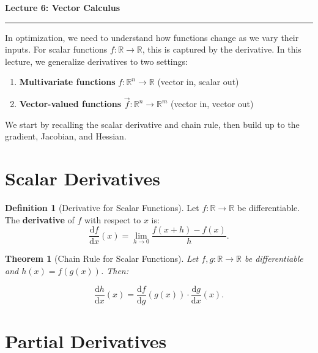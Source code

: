 \documentclass[10pt, twocolumn]{article}
\theoremstyle{definition}
\newtheorem{definition}{Definition}
\theoremstyle{plain}
\newtheorem{theorem}{Theorem}
\newcommand{\RR}{\mathbb{R}}
\begin{document}
\noindent
\begin{minipage}{\linewidth}
    \centering
    \textbf{\Large Lecture 6: Vector Calculus} \\[0.5em]
    \hrule
\end{minipage}
\vspace{1em}


In optimization, we need to understand how functions change as we vary their inputs. For scalar functions $f: \RR \to \RR$, this is captured by the derivative. In this lecture, we generalize derivatives to two settings:
\begin{enumerate}
    \item \textbf{Multivariate functions} $f: \RR^n \to \RR$ (vector in, scalar out)
    \item \textbf{Vector-valued functions} $\vec{f}: \RR^n \to \RR^m$ (vector in, vector out)
\end{enumerate}

We start by recalling the scalar derivative and chain rule, then build up to the gradient, Jacobian, and Hessian.

\section{Scalar Derivatives}

\begin{definition}[Derivative for Scalar Functions]
Let $f: \RR \to \RR$ be differentiable. The \textbf{derivative} of $f$ with respect to $x$ is:
\[
    \frac{\mathrm{d}f}{\mathrm{d}x}(x) = \lim_{h \to 0} \frac{f(x + h) - f(x)}{h}.
\]
\end{definition}

\begin{theorem}[Chain Rule for Scalar Functions]
Let $f, g: \RR \to \RR$ be differentiable and $h(x) = f(g(x))$. Then:
\begin{result}
\[
    \frac{\mathrm{d}h}{\mathrm{d}x}(x) = \frac{\mathrm{d}f}{\mathrm{d}g}(g(x)) \cdot \frac{\mathrm{d}g}{\mathrm{d}x}(x).
\]
\end{result}
\end{theorem}

\section{Partial Derivatives}
\end{document}
